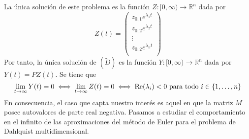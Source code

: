 \documentclass[11pt]{report}
\theoremstyle{mytheorem}
\theoremstyle{mydefinition}
\theoremstyle{myexample}
\newcommand{\R}{\mathbb R}
\begin{document}
La única solución de este problema es la función $Z \colon [0,\infty) \to \R^n$ dada por
\[Z(t) =\left( \begin{array}{c}
     z_{0,1}e^{\lambda_1t}\\[5pt]
     z_{0,2}e^{\lambda_2t}\\[5pt]
     \vdots \\[5pt]
     z_{0,2}e^{\lambda_nt}\\
\end{array} \right)
\]
Por tanto, la única solución de $(\widetilde{D})$ es la función $Y \colon [0,\infty) \to \R^n$ dada por $Y(t) = PZ(t)$. Se tiene que
\[\lim_{t \to \infty} Y(t) = 0 \iff \lim_{t \to \infty} Z(t) = 0 \iff \textup{Re}(\lambda_i) < 0 \textup{ para todo } i \in \{1,\mathellipsis,n\}\]
En consecuencia, el caso que capta nuestro interés es aquel en que la matriz $M$ posee autovalores de parte real negativa. Pasamos a estudiar el comportamiento en el infinito de las aproximaciones del método de Euler para el problema de Dahlquist multidimensional.
\end{document}
